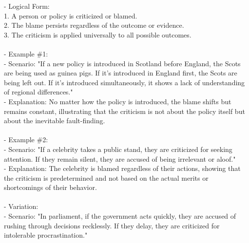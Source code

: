 \documentclass[a4paper,12pt,single,pdftex]{scrbook}
\begin{document}
    
      - Logical Form:
    \\

    
        1. A person or policy is criticized or blamed.
    \\

    
        2. The blame persists regardless of the outcome or evidence.
    \\

    
        3. The criticism is applied universally to all possible outcomes.
    \\

    
      
    \\

    
      - Example \#1:
    \\

    
        - Scenario: "If a new policy is introduced in Scotland before England, the Scots are being used as guinea pigs. If it’s introduced in England first, the Scots are being left out. If it’s introduced simultaneously, it shows a lack of understanding of regional differences."
    \\

    
        - Explanation: No matter how the policy is introduced, the blame shifts but remains constant, illustrating that the criticism is not about the policy itself but about the inevitable fault-finding.
    \\

    
      
    \\

    
      - Example \#2:
    \\

    
        - Scenario: "If a celebrity takes a public stand, they are criticized for seeking attention. If they remain silent, they are accused of being irrelevant or aloof."
    \\

    
        - Explanation: The celebrity is blamed regardless of their actions, showing that the criticism is predetermined and not based on the actual merits or shortcomings of their behavior.
    \\

    
      
    \\

    
      - Variation:
    \\

    
        - Scenario: "In parliament, if the government acts quickly, they are accused of rushing through decisions recklessly. If they delay, they are criticized for intolerable procrastination."
    \\
\end{document}
